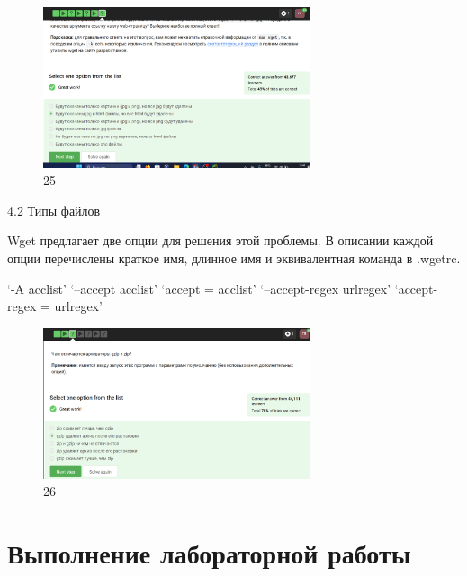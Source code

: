 \begin{figure}
\hypertarget{fig:025}{%
\centering
\includegraphics[width=0.7\textwidth,height=\textheight]{image/25.png}
\caption{25}\label{fig:025}
}
\end{figure}

4.2 Типы файлов

Wget предлагает две опции для решения этой проблемы. В описании каждой
опции перечислены краткое имя, длинное имя и эквивалентная команда в
.wgetrc.

`-A acclist' `--accept acclist' `accept = acclist' `--accept-regex
urlregex' `accept-regex = urlregex'

\begin{figure}
\hypertarget{fig:026}{%
\centering
\includegraphics[width=0.7\textwidth,height=\textheight]{image/26.png}
\caption{26}\label{fig:026}
}
\end{figure}

\hypertarget{ux432ux44bux43fux43eux43bux43dux435ux43dux438ux435-ux43bux430ux431ux43eux440ux430ux442ux43eux440ux43dux43eux439-ux440ux430ux431ux43eux442ux44b-18}{%
\section{Выполнение лабораторной
работы}\label{ux432ux44bux43fux43eux43bux43dux435ux43dux438ux435-ux43bux430ux431ux43eux440ux430ux442ux43eux440ux43dux43eux439-ux440ux430ux431ux43eux442ux44b-18}}

